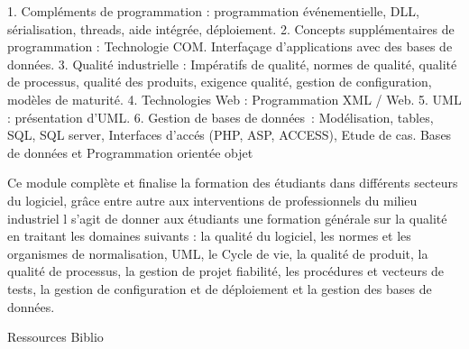 
{
1.	Compléments de programmation : programmation événementielle, DLL, sérialisation, threads, aide intégrée, déploiement.
2.	Concepts supplémentaires de programmation : Technologie COM. Interfaçage d'applications avec des bases de données.
3.	Qualité industrielle : Impératifs de qualité, normes de qualité, qualité de processus, qualité des produits, exigence qualité, gestion de configuration, modèles de maturité.
4.	Technologies Web : Programmation XML / Web.
5.	UML : présentation d'UML. 
6.	Gestion de bases de données : Modélisation, tables, SQL, SQL server, Interfaces d'accés (PHP, ASP, ACCESS), Etude de cas. 
} 
{Bases de données et Programmation orientée objet} 
{\begin{itemize}
\ObjItem Ce module complète et finalise la formation des étudiants dans différents secteurs du logiciel, grâce entre autre aux interventions de professionnels du milieu industriel
\ObjItem l s'agit de donner aux étudiants une formation générale sur la qualité en traitant les domaines suivants : la qualité du logiciel, les normes et les organismes de normalisation, UML, le Cycle de vie, la qualité de produit, la qualité de processus, la gestion de projet fiabilité, les procédures et vecteurs de tests, la gestion de configuration et de déploiement et la gestion des bases de données.
\end{itemize} 
} 
{Ressources} 
{Biblio} 
 
\vfill

